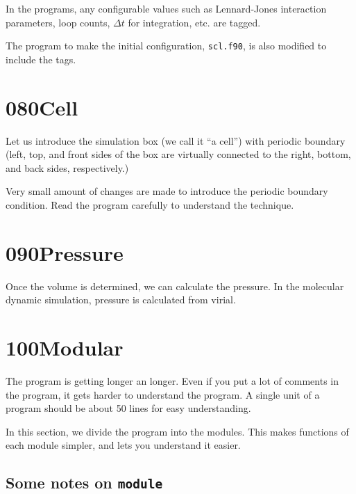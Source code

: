 \documentclass[a4,10pt]{article}
\begin{document}
In the programs, any configurable values such as Lennard-Jones interaction parameters, loop counts, $\Delta t$ for integration, etc. are tagged.

The program to make the initial configuration, {\tt scl.f90}, is also modified to include the tags.

\section{080Cell}

Let us introduce the simulation box (we call it ``a cell'') with periodic boundary (left, top, and front sides of the box are virtually connected to the right, bottom, and back sides, respectively.)

Very small amount of changes are made to introduce the periodic boundary condition.  Read the program carefully to understand the technique.


\section{090Pressure}

Once the volume is determined, we can calculate the pressure.  In the molecular dynamic simulation, pressure is calculated from virial.


\section{100Modular}

The program is getting longer an longer.  Even if you put a lot of comments in the program, it gets harder to understand the program.  A single unit of a program should be about 50 lines for easy understanding.

In this section, we divide the program into the modules.  This makes functions of each module simpler, and lets you understand it easier.
\subsection{Some notes on \tt module}
\end{document}
